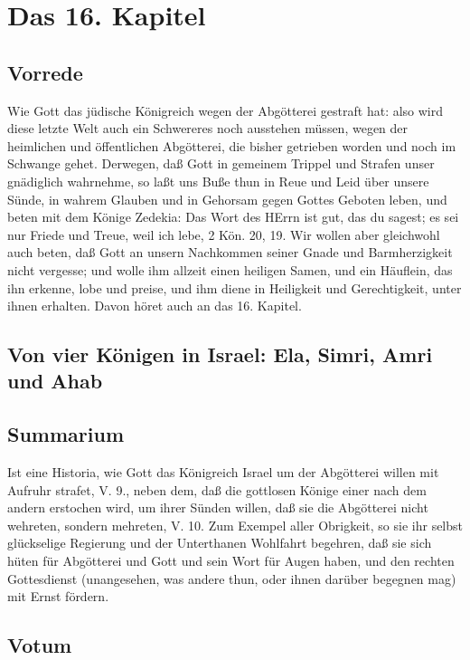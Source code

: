 \chapter{Das 16. Kapitel}

\section{Vorrede}

Wie Gott das jüdische Königreich wegen der Abgötterei gestraft hat: also wird diese letzte Welt auch ein Schwereres noch ausstehen müssen, wegen der heimlichen und öffentlichen Abgötterei, die bisher getrieben worden und noch im Schwange gehet. Derwegen, daß Gott in gemeinem Trippel und Strafen unser gnädiglich wahrnehme, so laßt uns Buße thun in Reue und Leid über unsere Sünde, in wahrem Glauben und in Gehorsam gegen Gottes Geboten leben, und beten mit dem Könige Zedekia: Das Wort des HErrn ist gut, das du sagest; es sei nur Friede und Treue, weil ich lebe, 2 Kön. 20, 19. Wir wollen aber gleichwohl auch beten, daß Gott an unsern Nachkommen seiner Gnade und Barmherzigkeit nicht vergesse; und wolle ihm allzeit einen heiligen Samen, und ein Häuflein, das ihn erkenne, lobe und preise, und ihm diene in Heiligkeit und Gerechtigkeit, unter ihnen erhalten. Davon höret auch an das 16. Kapitel.

\section{Von vier Königen in Israel: Ela, Simri, Amri und Ahab}

\section{Summarium}

Ist eine Historia, wie Gott das Königreich Israel um der Abgötterei willen mit Aufruhr strafet, V. 9., neben dem, daß die gottlosen Könige einer nach dem andern erstochen wird, um ihrer Sünden willen, daß sie die Abgötterei nicht wehreten, sondern mehreten, V. 10. Zum Exempel aller Obrigkeit, so sie ihr selbst glückselige Regierung und der Unterthanen Wohlfahrt
 begehren, daß sie sich hüten für Abgötterei und Gott und sein Wort für Augen haben, und den rechten Gottesdienst (unangesehen, was andere thun, oder ihnen darüber begegnen mag) mit Ernst fördern.

\section{Votum}

